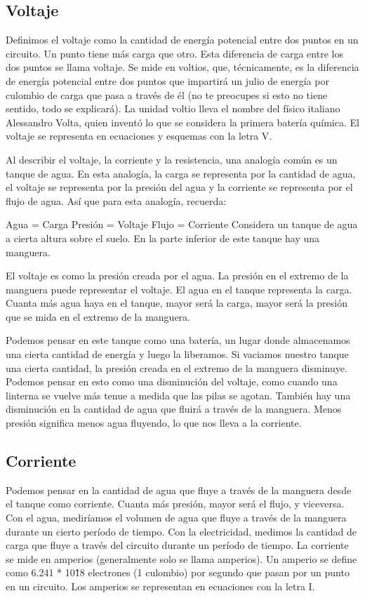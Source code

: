 \documentclass[output=paper, 
colorlinks,
citecolor=brown,
newtxmath
]{langscibook}
\begin{document}
\subsection{Voltaje}

Definimos el voltaje como la cantidad de energía potencial entre dos puntos en un circuito. Un punto tiene más carga que otro. Esta diferencia de carga entre los dos puntos se llama voltaje. Se mide en voltios, que, técnicamente, es la diferencia de energía potencial entre dos puntos que impartirá un julio de energía por culombio de carga que pasa a través de él (no te preocupes si esto no tiene sentido, todo se explicará). La unidad voltio lleva el nombre del físico italiano Alessandro Volta, quien inventó lo que se considera la primera batería química. El voltaje se representa en ecuaciones y esquemas con la letra V.

Al describir el voltaje, la corriente y la resistencia, una analogía común es un tanque de agua. En esta analogía, la carga se representa por la cantidad de agua, el voltaje se representa por la presión del agua y la corriente se representa por el flujo de agua. Así que para esta analogía, recuerda:

Agua = Carga
Presión = Voltaje
Flujo = Corriente
Considera un tanque de agua a cierta altura sobre el suelo. En la parte inferior de este tanque hay una manguera.

El voltaje es como la presión creada por el agua.
La presión en el extremo de la manguera puede representar el voltaje. El agua en el tanque representa la carga. Cuanta más agua haya en el tanque, mayor será la carga, mayor será la presión que se mida en el extremo de la manguera.

Podemos pensar en este tanque como una batería, un lugar donde almacenamos una cierta cantidad de energía y luego la liberamos. Si vaciamos nuestro tanque una cierta cantidad, la presión creada en el extremo de la manguera disminuye. Podemos pensar en esto como una disminución del voltaje, como cuando una linterna se vuelve más tenue a medida que las pilas se agotan. También hay una disminución en la cantidad de agua que fluirá a través de la manguera. Menos presión significa menos agua fluyendo, lo que nos lleva a la corriente.

\subsection{Corriente}

Podemos pensar en la cantidad de agua que fluye a través de la manguera desde el tanque como corriente. Cuanta más presión, mayor será el flujo, y viceversa. Con el agua, mediríamos el volumen de agua que fluye a través de la manguera durante un cierto período de tiempo. Con la electricidad, medimos la cantidad de carga que fluye a través del circuito durante un período de tiempo. La corriente se mide en amperios (generalmente solo se llama amperios). Un amperio se define como 6.241 * 10\^18 electrones (1 culombio) por segundo que pasan por un punto en un circuito. Los amperios se representan en ecuaciones con la letra I.
\end{document}
